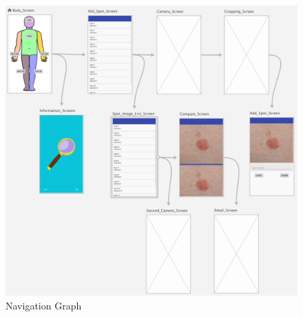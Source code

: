 \clearpage
\begin{figure}
    \includegraphics[width=1.2\textwidth, center]{figures/nav_graph.png}
    \caption{Navigation Graph}
    \label{fig:nav_graph}
\end{figure}